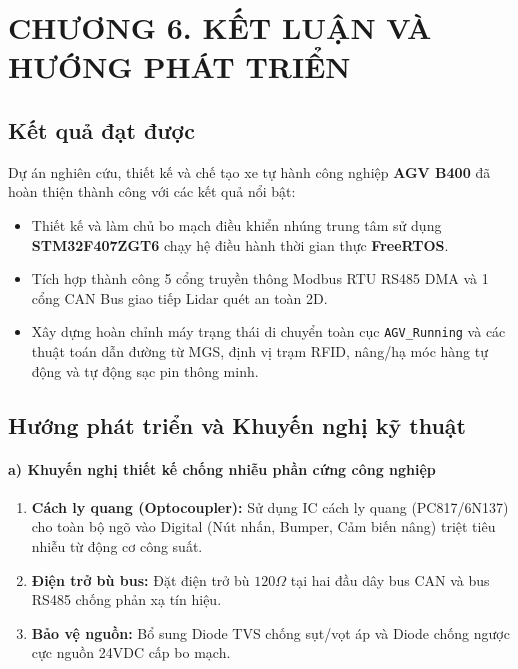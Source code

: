 \documentclass{article}
\begin{document}
\section*{CHƯƠNG 6. KẾT LUẬN VÀ HƯỚNG PHÁT TRIỂN}
\setcounter{section}{6}
\setcounter{subsection}{0}
\setcounter{figure}{0}
\setcounter{table}{0}

\subsection{Kết quả đạt được}
Dự án nghiên cứu, thiết kế và chế tạo xe tự hành công nghiệp \textbf{AGV B400} đã hoàn thiện thành công với các kết quả nổi bật:
\begin{itemize}
    \item Thiết kế và làm chủ bo mạch điều khiển nhúng trung tâm sử dụng \textbf{STM32F407ZGT6} chạy hệ điều hành thời gian thực \textbf{FreeRTOS}.
    \item Tích hợp thành công 5 cổng truyền thông Modbus RTU RS485 DMA và 1 cổng CAN Bus giao tiếp Lidar quét an toàn 2D.
    \item Xây dựng hoàn chỉnh máy trạng thái di chuyển toàn cục \texttt{AGV\_Running} và các thuật toán dẫn đường từ MGS, định vị trạm RFID, nâng/hạ móc hàng tự động và tự động sạc pin thông minh.
\end{itemize}

\subsection{Hướng phát triển và Khuyến nghị kỹ thuật}

\paragraph{a) Khuyến nghị thiết kế chống nhiễu phần cứng công nghiệp}
\begin{enumerate}
    \item \textbf{Cách ly quang (Optocoupler):} Sử dụng IC cách ly quang (PC817/6N137) cho toàn bộ ngõ vào Digital (Nút nhấn, Bumper, Cảm biến nâng) triệt tiêu nhiễu từ động cơ công suất.
    \item \textbf{Điện trở bù bus:} Đặt điện trở bù $120\Omega$ tại hai đầu dây bus CAN và bus RS485 chống phản xạ tín hiệu.
    \item \textbf{Bảo vệ nguồn:} Bổ sung Diode TVS chống sụt/vọt áp và Diode chống ngược cực nguồn 24VDC cấp bo mạch.
\end{enumerate}
\end{document}
